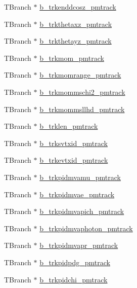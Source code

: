 \begin{DoxyCompactItemize}
\item 
T\-Branch $\ast$ \hyperlink{classanatree_ac4c4cbce176d24bf41cf72d66a1a5126}{b\-\_\-trkenddcosz\-\_\-pmtrack}
\item 
T\-Branch $\ast$ \hyperlink{classanatree_ac2cbe06f8207532244b90074b0c638e0}{b\-\_\-trkthetaxz\-\_\-pmtrack}
\item 
T\-Branch $\ast$ \hyperlink{classanatree_a10e874ea3fc896377207c3216f97fd3c}{b\-\_\-trkthetayz\-\_\-pmtrack}
\item 
T\-Branch $\ast$ \hyperlink{classanatree_a1d52f3502b617cefdec02b0ccc626085}{b\-\_\-trkmom\-\_\-pmtrack}
\item 
T\-Branch $\ast$ \hyperlink{classanatree_a5bb02256a7a2f3b81fbc3567f1241f63}{b\-\_\-trkmomrange\-\_\-pmtrack}
\item 
T\-Branch $\ast$ \hyperlink{classanatree_a60916370f2dddc226c224b1dbf02db0c}{b\-\_\-trkmommschi2\-\_\-pmtrack}
\item 
T\-Branch $\ast$ \hyperlink{classanatree_ab37a745d92d64a057ed964899a67b997}{b\-\_\-trkmommsllhd\-\_\-pmtrack}
\item 
T\-Branch $\ast$ \hyperlink{classanatree_ab493ed3597b226713def0475341d90d6}{b\-\_\-trklen\-\_\-pmtrack}
\item 
T\-Branch $\ast$ \hyperlink{classanatree_a196d28fbde8ad3263faf45b8c85117b3}{b\-\_\-trksvtxid\-\_\-pmtrack}
\item 
T\-Branch $\ast$ \hyperlink{classanatree_a1c0be1bb5c6c26c7024191b1c3653024}{b\-\_\-trkevtxid\-\_\-pmtrack}
\item 
T\-Branch $\ast$ \hyperlink{classanatree_a6fd89f379642a84d1aa4505375b74843}{b\-\_\-trkpidmvamu\-\_\-pmtrack}
\item 
T\-Branch $\ast$ \hyperlink{classanatree_a9d73fd296b3092ca78be2916f09e3c8f}{b\-\_\-trkpidmvae\-\_\-pmtrack}
\item 
T\-Branch $\ast$ \hyperlink{classanatree_af35237898d9339ee414e664675dad0b0}{b\-\_\-trkpidmvapich\-\_\-pmtrack}
\item 
T\-Branch $\ast$ \hyperlink{classanatree_a9e287ce9f79dc9a466e23f2446a909dc}{b\-\_\-trkpidmvaphoton\-\_\-pmtrack}
\item 
T\-Branch $\ast$ \hyperlink{classanatree_a0f3cd50b87a9523f96bcf868642777e0}{b\-\_\-trkpidmvapr\-\_\-pmtrack}
\item 
T\-Branch $\ast$ \hyperlink{classanatree_ada61c30b08638269d869939c011ddca9}{b\-\_\-trkpidpdg\-\_\-pmtrack}
\item 
T\-Branch $\ast$ \hyperlink{classanatree_afd1720b1884e1de63b86b3424b3d3bdc}{b\-\_\-trkpidchi\-\_\-pmtrack}

\end{DoxyCompactItemize}
